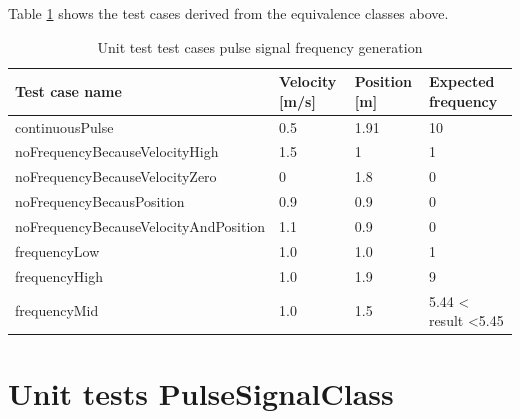 Table \ref{tbl:D9_FrequencyGenerationTestCases} shows the test cases derived from the equivalence classes above.
\begin{table}[H]
\centering
\caption{Unit test test cases pulse signal frequency generation}
\begin{adjustbox}{width=1\textwidth, center=\textwidth}
\renewcommand{\arraystretch}{1}
\begin{tabular}{llll}
\textbf{Test case name}               & \textbf{Velocity {[}m/s{]}} & \textbf{Position {[}m{]}} & \textbf{Expected frequency} \\ \hline
continuousPulse                       & 0.5                         & 1.91                      & 10                                    \\
noFrequencyBecauseVelocityHigh        & 1.5                         & 1                         & 1                                     \\
noFrequencyBecauseVelocityZero        & 0                           & 1.8                       & 0                                     \\
noFrequencyBecausPosition             & 0.9                         & 0.9                       & 0                                     \\
noFrequencyBecauseVelocityAndPosition & 1.1                         & 0.9                       & 0                                     \\
frequencyLow                          & 1.0                         & 1.0                       & 1                                     \\
frequencyHigh                         & 1.0                         & 1.9                       & 9                                     \\
frequencyMid                          & 1.0                         & 1.5                       & 5.44 < result \textless 5.45 
\end{tabular}
\end{adjustbox}
\label{tbl:D9_FrequencyGenerationTestCases}
\end{table}

\section{Unit tests PulseSignalClass}

